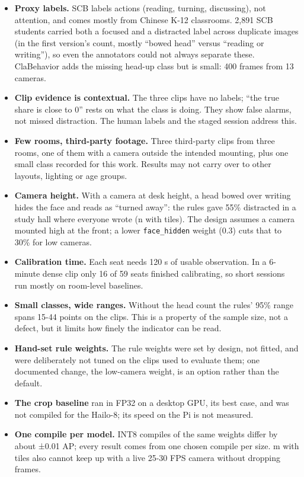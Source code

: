 \begin{itemize}
\tightlist
\item
  \textbf{Proxy labels.} SCB labels actions (reading, turning, discussing), not attention, and comes mostly from Chinese K-12 classrooms. 2,891 SCB students carried both a focused and a distracted label across duplicate images (in the first version's count, mostly ``bowed head'' versus ``reading or writing''), so even the annotators could not always separate these. ClaBehavior adds the missing head-up class but is small: 400 frames from 13 cameras.
\item
  \textbf{Clip evidence is contextual.} The three clips have no labels; ``the true share is close to 0'' rests on what the class is doing. They show false alarms, not missed distraction. The human labels and the staged session address this.
\item
  \textbf{Few rooms, third-party footage.} Three third-party clips from three rooms, one of them with a camera outside the intended mounting, plus one small class recorded for this work. Results may not carry over to other layouts, lighting or age groups.
\item
  \textbf{Camera height.} With a camera at desk height, a head bowed over writing hides the face and reads as ``turned away'': the rules gave 55\% distracted in a study hall where everyone wrote (n with tiles). The design assumes a camera mounted high at the front; a lower \texttt{face\_hidden} weight (0.3) cuts that to 30\% for low cameras.
\item
  \textbf{Calibration time.} Each seat needs 120 s of usable observation. In a 6-minute dense clip only 16 of 59 seats finished calibrating, so short sessions run mostly on room-level baselines.
\item
  \textbf{Small classes, wide ranges.} Without the head count the rules' 95\% range spans 15-44 points on the clips. This is a property of the sample size, not a defect, but it limits how finely the indicator can be read.
\item
  \textbf{Hand-set rule weights.} The rule weights were set by design, not fitted, and were deliberately not tuned on the clips used to evaluate them; one documented change, the low-camera weight, is an option rather than the default.
\item
  \textbf{The crop baseline} ran in FP32 on a desktop GPU, its best case, and was not compiled for the Hailo-8; its speed on the Pi is not measured.
\item
  \textbf{One compile per model.} INT8 compiles of the same weights differ by about ±0.01 AP; every result comes from one chosen compile per size. m with tiles also cannot keep up with a live 25-30 FPS camera without dropping frames.

\end{itemize}
